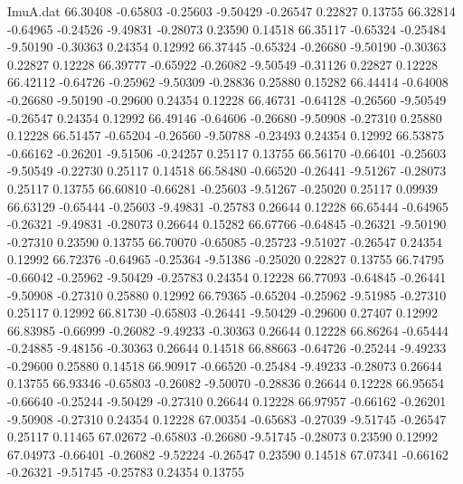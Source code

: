 \begin{filecontents}{ImuA.dat}
  66.30408   -0.65803   -0.25603   -9.50429   -0.26547    0.22827    0.13755
  66.32814   -0.64965   -0.24526   -9.49831   -0.28073    0.23590    0.14518
  66.35117   -0.65324   -0.25484   -9.50190   -0.30363    0.24354    0.12992
  66.37445   -0.65324   -0.26680   -9.50190   -0.30363    0.22827    0.12228
  66.39777   -0.65922   -0.26082   -9.50549   -0.31126    0.22827    0.12228
  66.42112   -0.64726   -0.25962   -9.50309   -0.28836    0.25880    0.15282
  66.44414   -0.64008   -0.26680   -9.50190   -0.29600    0.24354    0.12228
  66.46731   -0.64128   -0.26560   -9.50549   -0.26547    0.24354    0.12992
  66.49146   -0.64606   -0.26680   -9.50908   -0.27310    0.25880    0.12228
  66.51457   -0.65204   -0.26560   -9.50788   -0.23493    0.24354    0.12992
  66.53875   -0.66162   -0.26201   -9.51506   -0.24257    0.25117    0.13755
  66.56170   -0.66401   -0.25603   -9.50549   -0.22730    0.25117    0.14518
  66.58480   -0.66520   -0.26441   -9.51267   -0.28073    0.25117    0.13755
  66.60810   -0.66281   -0.25603   -9.51267   -0.25020    0.25117    0.09939
  66.63129   -0.65444   -0.25603   -9.49831   -0.25783    0.26644    0.12228
  66.65444   -0.64965   -0.26321   -9.49831   -0.28073    0.26644    0.15282
  66.67766   -0.64845   -0.26321   -9.50190   -0.27310    0.23590    0.13755
  66.70070   -0.65085   -0.25723   -9.51027   -0.26547    0.24354    0.12992
  66.72376   -0.64965   -0.25364   -9.51386   -0.25020    0.22827    0.13755
  66.74795   -0.66042   -0.25962   -9.50429   -0.25783    0.24354    0.12228
  66.77093   -0.64845   -0.26441   -9.50908   -0.27310    0.25880    0.12992
  66.79365   -0.65204   -0.25962   -9.51985   -0.27310    0.25117    0.12992
  66.81730   -0.65803   -0.26441   -9.50429   -0.29600    0.27407    0.12992
  66.83985   -0.66999   -0.26082   -9.49233   -0.30363    0.26644    0.12228
  66.86264   -0.65444   -0.24885   -9.48156   -0.30363    0.26644    0.14518
  66.88663   -0.64726   -0.25244   -9.49233   -0.29600    0.25880    0.14518
  66.90917   -0.66520   -0.25484   -9.49233   -0.28073    0.26644    0.13755
  66.93346   -0.65803   -0.26082   -9.50070   -0.28836    0.26644    0.12228
  66.95654   -0.66640   -0.25244   -9.50429   -0.27310    0.26644    0.12228
  66.97957   -0.66162   -0.26201   -9.50908   -0.27310    0.24354    0.12228
  67.00354   -0.65683   -0.27039   -9.51745   -0.26547    0.25117    0.11465
  67.02672   -0.65803   -0.26680   -9.51745   -0.28073    0.23590    0.12992
  67.04973   -0.66401   -0.26082   -9.52224   -0.26547    0.23590    0.14518
  67.07341   -0.66162   -0.26321   -9.51745   -0.25783    0.24354    0.13755

\end{filecontents}
